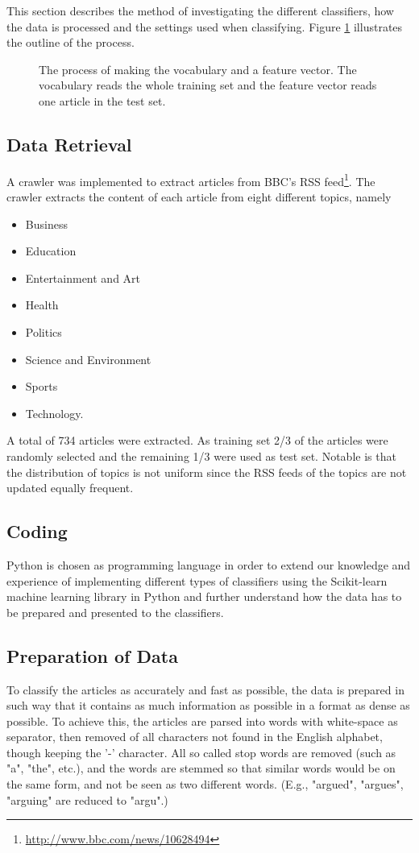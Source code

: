 This section describes the method of investigating the different classifiers, how the data is processed and the settings used when classifying. Figure \ref{fig:flowchart} illustrates the outline of the process.
\begin{figure}[H]
\begin{center}

\caption{The process of making the vocabulary and a feature vector. The vocabulary reads the whole training set and the feature vector reads one article in the test set.}
\label{fig:flowchart}
\end{center}
\end{figure}

\subsection{Data Retrieval}
A crawler was implemented to extract articles from BBC's RSS feed\footnote{\url{http://www.bbc.com/news/10628494}}. The crawler extracts the content of each article from eight different topics, namely
\begin{itemize}[noitemsep,nolistsep]
\small
	\item Business
	\item Education
	\item Entertainment and Art
	\item Health
	\item Politics
	\item Science and Environment
	\item Sports
	\item Technology.
\end{itemize}
A total of 734 articles were extracted. As training set 2/3 of the articles were randomly selected and the remaining 1/3 were used as test set. Notable is that the distribution of topics is not uniform since the RSS feeds of the topics are not updated equally frequent. 
\subsection{Coding}
Python is chosen as programming language in order to extend our knowledge and experience of implementing different types of classifiers using the Scikit-learn machine learning library in Python and further understand how the data has to be prepared and presented to the classifiers.
\subsection{Preparation of Data}
To classify the articles as accurately and fast as possible, the data is prepared in such way that it contains as much information as possible in a format as dense as possible. To achieve this, the articles are parsed into words with white-space as separator, then removed of all characters not found in the English alphabet, though keeping the '-' character. All so called stop words are removed (such as "a", "the", etc.), and the words are stemmed so that similar words would be on the same form, and not be seen as two different words. (E.g., "argued", "argues", "arguing" are reduced to "argu".)
